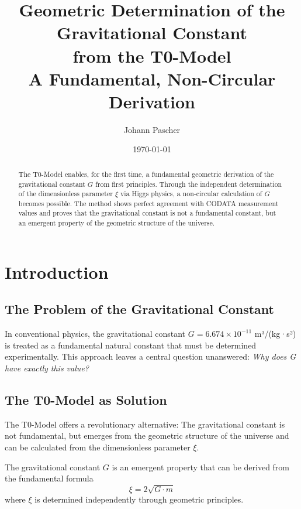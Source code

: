 \documentclass[12pt,a4paper]{article}
\title{Geometric Determination of the Gravitational Constant\\from the T0-Model\\
	\large A Fundamental, Non-Circular Derivation}
\author{Johann Pascher}
\date{\today}
\begin{document}
	
	\maketitle
	
	\begin{abstract}
		The T0-Model enables, for the first time, a fundamental geometric derivation of the gravitational constant $G$ from first principles. Through the independent determination of the dimensionless parameter $\xi$ via Higgs physics, a non-circular calculation of $G$ becomes possible. The method shows perfect agreement with CODATA measurement values and proves that the gravitational constant is not a fundamental constant, but an emergent property of the geometric structure of the universe.
	\end{abstract}
	
	\tableofcontents
	\newpage
	
	\section{Introduction}
	
	\subsection{The Problem of the Gravitational Constant}
	
	In conventional physics, the gravitational constant $G = 6.674 \times 10^{-11}$ m³/(kg·s²) is treated as a fundamental natural constant that must be determined experimentally. This approach leaves a central question unanswered: \textit{Why does G have exactly this value?}
	
	\subsection{The T0-Model as Solution}
	
	The T0-Model offers a revolutionary alternative: The gravitational constant is not fundamental, but emerges from the geometric structure of the universe and can be calculated from the dimensionless parameter $\xi$.
	
	\begin{tcolorbox}[colback=blue!5!white,colframe=blue!75!black,title=Central Thesis]
		The gravitational constant $G$ is an emergent property that can be derived from the fundamental formula
		\begin{equation}
			\xi = 2\sqrt{G \cdot m}
		\end{equation}
		where $\xi$ is determined independently through geometric principles.
	\end{tcolorbox}
	
\end{document}
